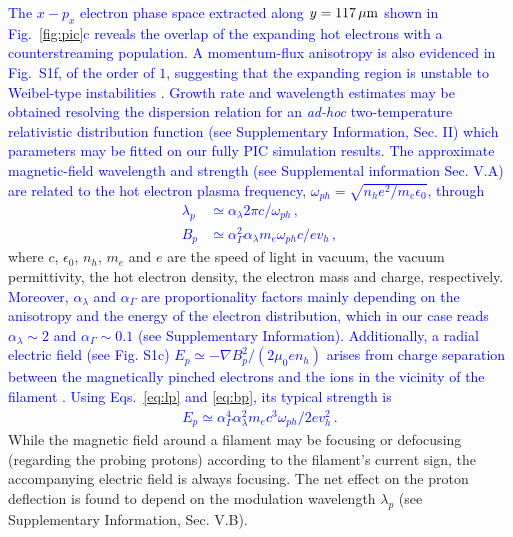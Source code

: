 \documentclass[aps,twocolumn,showpacs,superscriptaddress]{revtex4}
\begin{document}
\textcolor{blue}{The $x-p_x$ electron phase space extracted along $y = 117\,\rm \mu m$ shown in Fig.~\ref{fig:pic}c reveals the overlap of the expanding hot electrons  with a counterstreaming population. A momentum-flux anisotropy is also evidenced in Fig.~S1f, of the order of $1$, suggesting that the expanding region is unstable to Weibel-type instabilities \cite{POP_Ren_2006, PRL_Gode_2017}. Growth rate and wavelength estimates may be obtained resolving the dispersion relation  for an \emph{ad-hoc} two-temperature relativistic distribution function (see Supplementary Information, Sec. II) which parameters may be fitted on our fully PIC simulation results.
The approximate magnetic-field wavelength and strength (see Supplemental information Sec. V.A) are related to the hot electron plasma frequency, $\omega_{ph}=\sqrt{n_h e^2/m_e \epsilon_0}$, through 
\begin{align}
  \lambda_p &\simeq \alpha_\lambda 2\pi c/\omega_{ph} \label{eq:lp}  \,,\\
  B_p &\simeq \alpha_\Gamma^2\alpha_\lambda m_e \omega_{ph}c/ ev_h \label{eq:bp} \,, 
\end{align}}
where $c$, $\epsilon_0$, $n_h$, $m_e$ and $e$ are the speed of light in vacuum, the vacuum permittivity, the hot electron density, the electron mass and  charge, respectively. \textcolor{blue}{Moreover, $\alpha_\lambda $ and $\alpha_\Gamma $ are proportionality factors mainly depending on the anisotropy and the energy of the  electron distribution,  which  in our case reads $\alpha_\lambda\sim 2 $ and $\alpha_\Gamma\sim 0.1 $ (see Supplementary Information).
Additionally, a radial electric field (see Fig. S1c) $E_p \simeq - \nabla B_p^2/(2 \mu_0e n_h)$ arises from charge separation between the magnetically pinched electrons and the ions in the vicinity of the filament \cite{POP_Dieckmann_2009, POP_Bret_Gremillet_2010}. 
Using Eqs.~\eqref{eq:lp} and \eqref{eq:bp}, its typical strength is 
\begin{align} 
  E_p \simeq \alpha_\Gamma^4  \alpha_\lambda^2 m_ec^3\omega_{ph}/2ev_h^2 \label{eq:ep} \, .
\end{align}}
While the magnetic field around a filament may be focusing or defocusing (regarding the probing protons) according to the filament's current sign, the accompanying electric field is always focusing. The net effect on the proton deflection is found to depend on the modulation wavelength $\lambda_p$ (see Supplementary Information, Sec. V.B).
\end{document}
